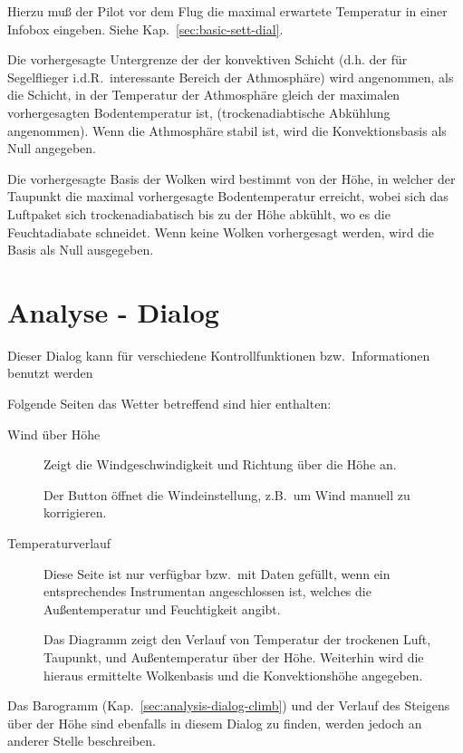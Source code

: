 Hierzu muß der Pilot vor dem Flug die maximal erwartete Temperatur in einer Infobox eingeben.
 Siehe Kap.~\ref{sec:basic-sett-dial}.

Die vorhergesagte  Untergrenze der der konvektiven Schicht (d.h. der für Segelflieger i.d.R.\ interessante
Bereich der Athmosphäre) wird angenommen, als die Schicht, in der Temperatur der Athmosphäre gleich der maximalen vorhergesagten Bodentemperatur ist, (trockenadiabtische Abkühlung angenommen).
Wenn die Athmosphäre stabil ist, wird die Konvektionsbasis als Null angegeben.

Die vorhergesagte Basis der Wolken wird bestimmt von der Höhe, in welcher der Taupunkt die
maximal vorhergesagte Bodentemperatur erreicht, wobei sich das Luftpaket sich trockenadiabatisch bis
zu der Höhe abkühlt, wo es die Feuchtadiabate schneidet. Wenn keine Wolken vorhergesagt werden, wird die Basis als Null ausgegeben.

\section{Analyse - Dialog}
Dieser Dialog kann für verschiedene Kontrollfunktionen bzw.\ Informationen benutzt werden 



Folgende Seiten das Wetter betreffend sind hier enthalten:
\begin{description}
\item[Wind über Höhe]
Zeigt die Windgeschwindigkeit und Richtung über die Höhe an.

Der Button  öffnet die Windeinstellung, z.B.\ um Wind manuell zu korrigieren.

\item[Temperaturverlauf]
 Diese Seite ist nur verfügbar bzw.\ mit Daten gefüllt, wenn ein entsprechendes Instrumentan  \xc angeschlossen ist, welches die Außentemperatur und Feuchtigkeit angibt.

Das Diagramm zeigt den Verlauf von Temperatur der trockenen Luft, Taupunkt, und Außentemperatur
über der Höhe. Weiterhin wird die hieraus ermittelte Wolkenbasis und die Konvektionshöhe  angegeben.


\end{description}
Das Barogramm (Kap.~\ref{sec:analysis-dialog-climb}) und der Verlauf des Steigens über der Höhe sind
ebenfalls in diesem Dialog zu finden, werden jedoch an anderer Stelle beschreiben.

